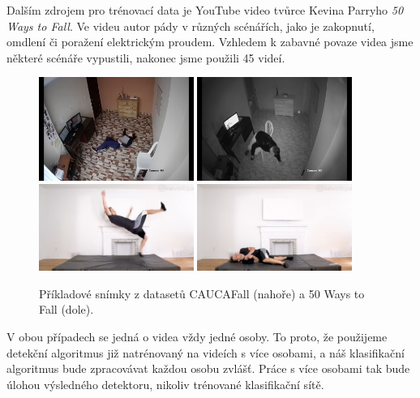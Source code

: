 Dalším zdrojem pro trénovací data je YouTube video tvůrce Kevina Parryho
\textit{50 Ways to Fall}. Ve videu autor pády v různých scénářích, jako je
zakopnutí, omdlení či poražení elektrickým proudem. Vzhledem k zabavné povaze
videa jsme některé scénáře vypustili, nakonec jsme použili 45 videí.



\begin{figure}[]
    \centering
    \includegraphics[width=0.45\textwidth]{Figures/datasets_examples/cauca1.png}
    \includegraphics[width=0.45\textwidth]{Figures/datasets_examples/cauca2.png}
    \includegraphics[width=0.45\textwidth]{Figures/datasets_examples/fifty1.png}
    \includegraphics[width=0.45\textwidth]{Figures/datasets_examples/fifty2.png}
\caption{Příkladové snímky z datasetů CAUCAFall (nahoře) a 50 Ways to Fall (dole).}
\label{fig:datasets_examples}
\end{figure}

V obou případech se jedná o videa vždy jedné osoby. To proto, že použijeme
detekční algoritmus již natrénovaný na videích s více osobami, a náš
klasifikační algoritmus bude zpracovávat každou osobu zvlášť. Práce s více
osobami tak bude úlohou výsledného detektoru, nikoliv trénované klasifikační
sítě.

